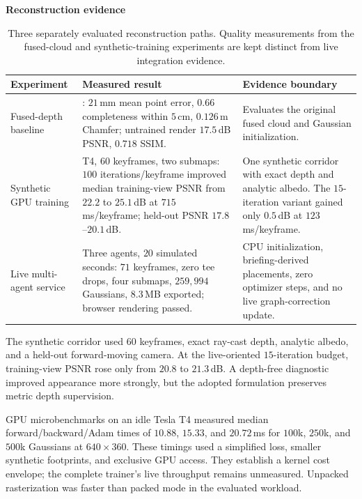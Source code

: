 \documentclass[10pt,a4paper]{article}
\renewcommand{\arraystretch}{1.12}
\newcommand{\code}[1]{\texttt{\small\detokenize{#1}}}
\newcommand{\indentedheading}[1]{\par\addvspace{0.65em}\noindent\hspace*{1em}\textbf{#1}\par\smallskip}
\begin{document}
\indentedheading{Reconstruction evidence}

\begin{table}[t]
\centering
\small
\setlength{\tabcolsep}{5pt}
\renewcommand{\arraystretch}{1.15}
\begin{tabular}{@{}
    P{2.7cm}
    P{7.0cm}
    P{6.1cm}
@{}}
\toprule
\textbf{Experiment} &
\textbf{Measured result} &
\textbf{Evidence boundary} \\
\midrule

Fused-depth baseline &
\code{ci\_tiny}: $21$\,mm mean point error,
$0.66$ completeness within $5$\,cm,
$0.126$\,m Chamfer; untrained render
$17.5$\,dB PSNR, $0.718$ SSIM. &
Evaluates the original fused cloud and Gaussian
initialization. \\

Synthetic GPU training &
T4, $60$ keyframes, two submaps:
$100$ iterations/keyframe improved median training-view
PSNR from $22.2$ to $25.1$\,dB at
$715$\,ms/keyframe; held-out PSNR
$17.8$--$20.1$\,dB. &
One synthetic corridor with exact depth and analytic
albedo. The $15$-iteration variant gained only
$0.5$\,dB at $123$\,ms/keyframe. \\

Live multi-agent service &
Three agents, $20$ simulated seconds:
$71$ keyframes, zero tee drops,
four submaps, $259{,}994$ Gaussians,
$8.3$\,MB exported; browser rendering passed. &
CPU initialization, briefing-derived placements,
zero optimizer steps, and no live graph-correction update. \\

\bottomrule
\end{tabular}
\caption{Three separately evaluated reconstruction paths.
Quality measurements from the fused-cloud and synthetic-training
experiments are kept distinct from live integration evidence.}
\label{tab:splat-evidence}
\end{table}

The synthetic corridor used $60$ keyframes, exact ray-cast depth,
analytic albedo, and a held-out forward-moving camera. At the
live-oriented $15$-iteration budget, training-view PSNR rose only
from $20.8$ to $21.3$\,dB. A depth-free diagnostic improved
appearance more strongly, but the adopted formulation preserves
metric depth supervision.

GPU microbenchmarks on an idle Tesla T4 measured median
forward/backward/Adam times of $10.88$, $15.33$, and
$20.72$\,ms for $100$k, $250$k, and $500$k Gaussians at
$640\times360$. These timings used a simplified loss, smaller
synthetic footprints, and exclusive GPU access. They establish
a kernel cost envelope; the complete trainer's live throughput
remains unmeasured. Unpacked rasterization was faster than
packed mode in the evaluated workload.
\end{document}
